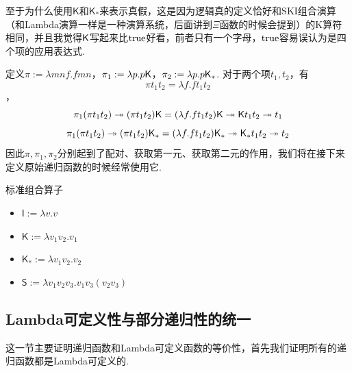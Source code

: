 至于为什么使用\(\mathsf{K}\)和\(\mathsf{K}_*\)来表示真假，这是因为逻辑真的定义恰好和SKI组合演算（和Lambda演算一样是一种演算系统，后面讲到\(\Xi\)函数的时候会提到）的K算符相同，并且我觉得\({\sf K}\)写起来比\({\rm true}\)好看，前者只有一个字母，\({\rm true}\)容易误认为是四个项的应用表达式.

定义\(\pi := \lambda mnf. fmn\)，\(\pi_1 := \lambda p. p{\sf K}\)，\(\pi_2 := \lambda p. p{\sf K}_*\). 对于两个项\(t_1,t_2\)，有
\[\pi t_1t_2 = \lambda f. ft_1t_2\]，
\[\pi_1 (\pi t_1t_2) \twoheadrightarrow (\pi t_1t_2){\sf K} = (\lambda f. ft_1t_2){\sf K} \twoheadrightarrow {\sf K}t_1t_2 \twoheadrightarrow t_1\]
\[\pi_1 (\pi t_1t_2) \twoheadrightarrow (\pi t_1t_2){\sf K}_* = (\lambda f. ft_1t_2){\sf K}_* \twoheadrightarrow {\sf K}_*t_1t_2 \twoheadrightarrow t_2\]
因此\(\pi,\pi_1,\pi_2\)分别起到了配对、获取第一元、获取第二元的作用，我们将在接下来定义原始递归函数的时候经常使用它.

\begin{definition}{标准组合算子}
    \begin{itemize}
        \item \(\mathsf{I} := \lambda v.v\)
        \item \(\mathsf{K} := \lambda v_1v_2.v_1\)
        \item \(\mathsf{K}_* := \lambda v_1v_2.v_2\)
        \item \(\mathsf{S} := \lambda v_1v_2v_3.v_1v_3(v_2v_3)\)
    \end{itemize}
\end{definition}

\subsection{Lambda可定义性与部分递归性的统一}

这一节主要证明递归函数和Lambda可定义函数的等价性，首先我们证明所有的递归函数都是Lambda可定义的. 

